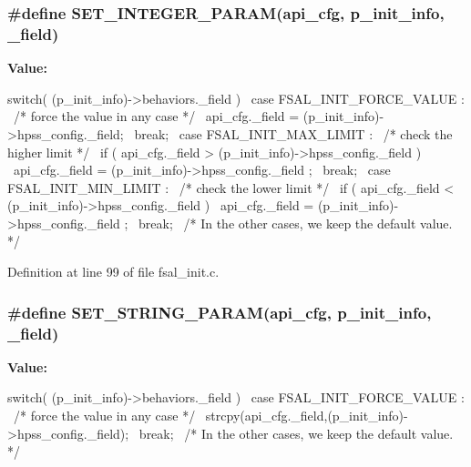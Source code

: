 \subsubsection[{SET\_\-INTEGER\_\-PARAM}]{\setlength{\rightskip}{0pt plus 5cm}\#define SET\_\-INTEGER\_\-PARAM(api\_\-cfg, \/  p\_\-init\_\-info, \/  \_\-field)}\label{fsal__init_8c_a802153fcb81fd9f7b272dbf6eb477aec}
{\bfseries Value:}
\begin{DoxyCode}
switch( (p_init_info)->behaviors._field ){                    \
    case FSAL_INIT_FORCE_VALUE :                                  \
        /* force the value in any case */                         \
        api_cfg._field = (p_init_info)->hpss_config._field;       \
        break;                                                \
    case FSAL_INIT_MAX_LIMIT :                                    \
      /* check the higher limit */                                \
      if ( api_cfg._field > (p_init_info)->hpss_config._field )   \
        api_cfg._field = (p_init_info)->hpss_config._field ;      \
        break;                                                \
    case FSAL_INIT_MIN_LIMIT :                                    \
      /* check the lower limit */                                 \
      if ( api_cfg._field < (p_init_info)->hpss_config._field )   \
        api_cfg._field = (p_init_info)->hpss_config._field ;      \
        break;                                                \
    /* In the other cases, we keep the default value. */          \
    }                                                             \
\end{DoxyCode}


Definition at line 99 of file fsal\_\-init.c.
\subsubsection[{SET\_\-STRING\_\-PARAM}]{\setlength{\rightskip}{0pt plus 5cm}\#define SET\_\-STRING\_\-PARAM(api\_\-cfg, \/  p\_\-init\_\-info, \/  \_\-field)}\label{fsal__init_8c_a7e81fe711a5c74c6137e9ee255672ff7}
{\bfseries Value:}
\begin{DoxyCode}
switch( (p_init_info)->behaviors._field ){                    \
    case FSAL_INIT_FORCE_VALUE :                                  \
      /* force the value in any case */                           \
      strcpy(api_cfg._field,(p_init_info)->hpss_config._field);   \
      break;                                                \
    /* In the other cases, we keep the default value. */          \
    }                                                             \
\end{DoxyCode}


